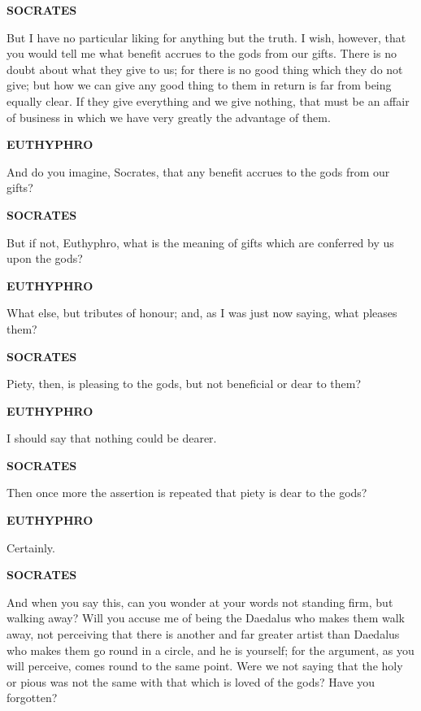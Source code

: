 \documentclass[11pt,letter]{article}
\begin{document}
\par \textbf{SOCRATES}
\par   But I have no particular liking for anything but the truth. I wish, however, that you would tell me what benefit accrues to the gods from our gifts. There is no doubt about what they give to us; for there is no good thing which they do not give; but how we can give any good thing to them in return is far from being equally clear. If they give everything and we give nothing, that must be an affair of business in which we have very greatly the advantage of them.

\par \textbf{EUTHYPHRO}
\par   And do you imagine, Socrates, that any benefit accrues to the gods from our gifts?

\par \textbf{SOCRATES}
\par   But if not, Euthyphro, what is the meaning of gifts which are conferred by us upon the gods?

\par \textbf{EUTHYPHRO}
\par   What else, but tributes of honour; and, as I was just now saying, what pleases them?

\par \textbf{SOCRATES}
\par   Piety, then, is pleasing to the gods, but not beneficial or dear to them?

\par \textbf{EUTHYPHRO}
\par   I should say that nothing could be dearer.

\par \textbf{SOCRATES}
\par   Then once more the assertion is repeated that piety is dear to the gods?

\par \textbf{EUTHYPHRO}
\par   Certainly.

\par \textbf{SOCRATES}
\par   And when you say this, can you wonder at your words not standing firm, but walking away? Will you accuse me of being the Daedalus who makes them walk away, not perceiving that there is another and far greater artist than Daedalus who makes them go round in a circle, and he is yourself; for the argument, as you will perceive, comes round to the same point. Were we not saying that the holy or pious was not the same with that which is loved of the gods? Have you forgotten?
\end{document}
